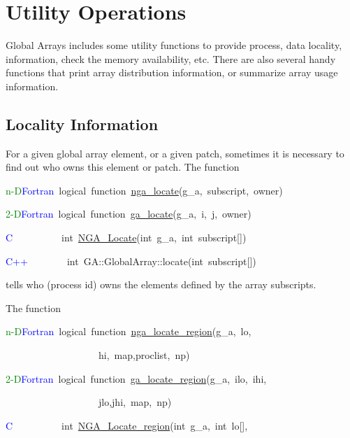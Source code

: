 \chapter{Utility Operations}

Global Arrays includes some utility functions to provide process,
data locality, information, check the memory availability, etc. There
are also several handy functions that print array distribution information,
or summarize array usage information. 


\section{Locality Information}

For a given global array element, or a given patch, sometimes it is
necessary to find out who owns this element or patch. The function

\textcolor{green}{n-D}\textcolor{blue}{Fortran}~logical~function~\href{https://hpc.pnl.gov/globalarrays/api/f_op_api.html\#ga_locate}{nga\_{}locate}(g\_a,~subscript,~owner)~

\textcolor{green}{2-D}\textcolor{blue}{Fortran}~logical~function~\href{https://hpc.pnl.gov/globalarrays/api/f_op_api.html\#ga_locate}{ga\_{}locate}(g\_a,~i,~j,~owner)~

\textcolor{blue}{C}~~~~~~~~~~int~\href{https://hpc.pnl.gov/globalarrays/api/c_op_api.html\#ga_locate}{NGA\_{}Locate}(int~g\_a,~int~subscript{[}{]})~

\textcolor{blue}{C++}~~~~~~~~int~GA::GlobalArray::locate(int~subscript{[}{]})

tells who (process id) owns the elements defined by the array subscripts.

The function

\textcolor{green}{n-D}\textcolor{blue}{Fortran}~logical~function~\href{https://hpc.pnl.gov/globalarrays/api/f_op_api.html\#ga_locate_region}{nga\_{}locate\_{}region}(g\_a,~lo,~

~~~~~~~~~~~~~~~~~~~hi,~map,proclist,~np)~

\textcolor{green}{2-D}\textcolor{blue}{Fortran}~logical~function~\href{https://hpc.pnl.gov/globalarrays/api/c_op_api.html\#ga_locate_region}{ga\_{}locate\_{}region}(g\_a,~ilo,~ihi,~

~~~~~~~~~~~~~~~~~~~jlo,jhi,~map,~np)~

\textcolor{blue}{C}~~~~~~~~~~int~\href{https://hpc.pnl.gov/globalarrays/api/c_op_api.html\#ga_locate_region}{NGA\_{}Locate\_{}region}(int~g\_a,~int~lo{[}{]},~

